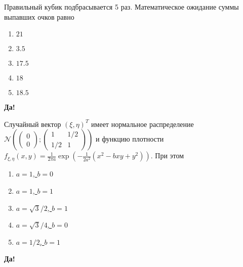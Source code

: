 \documentclass[t]{beamer}
\newcommand{\cN}{\mathcal{N}}
\begin{document}
 \begin{frame} \label{25-Yes} 
\begin{block}{25} 

  Правильный кубик подбрасывается 5 раз. Математическое ожидание суммы выпавших очков равно
  


 \end{block} 
\begin{enumerate} 
\item[] \hyperlink{25-No}{\beamergotobutton{} $21$}
\item[] \hyperlink{25-No}{\beamergotobutton{} $3.5$}
\item[] \hyperlink{25-Yes}{\beamergotobutton{} $17.5$}
\item[] \hyperlink{25-No}{\beamergotobutton{} $18$}
\item[] \hyperlink{25-No}{\beamergotobutton{} $18.5$}
\end{enumerate} 

 \textbf{Да!} 
 \hyperlink{26}{}\end{frame} 


 \begin{frame} \label{26-Yes} 
\begin{block}{26} 

  Случайный вектор $(\xi, \eta)^T$ имеет нормальное распределение
  $\cN \left(
  \begin{pmatrix}
    0 \\
    0
  \end{pmatrix};
  \begin{pmatrix}
    1 & 1/2 \\
    1/2 & 1
  \end{pmatrix}
\right)$ и функцию плотности $f_{\xi, \eta}(x, y) = \frac{1}{2\pi a} \exp\left(-\frac{1}{2a^2}(x^2-bxy+y^2) \right)$. При этом

  


 \end{block} 
\begin{enumerate} 
\item[] \hyperlink{26-No}{\beamergotobutton{} $a=1$, $b=0$}
\item[] \hyperlink{26-No}{\beamergotobutton{} $a=1$, $b=1$}
\item[] \hyperlink{26-Yes}{\beamergotobutton{} $a=\sqrt3/2$, $b=1$}
\item[] \hyperlink{26-No}{\beamergotobutton{} $a=\sqrt3/4$, $b=0$}
\item[] \hyperlink{26-No}{\beamergotobutton{} $a=1/2$, $b=1$}
\end{enumerate} 

 \textbf{Да!} 
 \hyperlink{27}{}\end{frame} 
\end{document}
